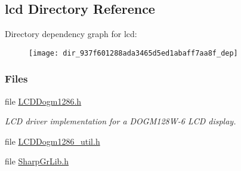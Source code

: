 \subsection{lcd Directory Reference}
\label{dir_937f601288ada3465d5ed1abaff7aa8f}
Directory dependency graph for lcd\+:
\nopagebreak
\begin{figure}[H]
\begin{center}
\leavevmode
\texttt{[image: dir\_937f601288ada3465d5ed1abaff7aa8f\_dep]}
\end{center}
\end{figure}
\subsubsection*{Files}
\begin{DoxyCompactItemize}
\item 
file \hyperlink{_l_c_d_dogm1286_8h}{L\+C\+D\+Dogm1286.\+h}
\begin{DoxyCompactList}\small\item\em L\+C\+D driver implementation for a D\+O\+G\+M128\+W-\/6 L\+C\+D display. \end{DoxyCompactList}\item 
file \hyperlink{_l_c_d_dogm1286__util_8h}{L\+C\+D\+Dogm1286\+\_\+util.\+h}
\item 
file \hyperlink{_sharp_gr_lib_8h}{Sharp\+Gr\+Lib.\+h}
\end{DoxyCompactItemize}
